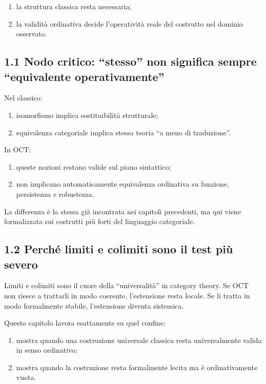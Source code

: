 \begin{enumerate}
\def\labelenumi{\arabic{enumi}.}
\tightlist
\item
  la struttura classica resta necessaria;
\item
  la validità ordinativa decide l'operatività reale del costrutto nel dominio osservato.
\end{enumerate}

\subsection{1.1 Nodo critico: ``stesso'' non significa sempre ``equivalente operativamente''}

Nel classico:

\begin{enumerate}
\def\labelenumi{\arabic{enumi}.}
\tightlist
\item
  isomorfismo implica sostituibilità strutturale;
\item
  equivalenza categoriale implica stessa teoria ``a meno di traduzione''.
\end{enumerate}

In OCT:

\begin{enumerate}
\def\labelenumi{\arabic{enumi}.}
\tightlist
\item
  queste nozioni restano valide sul piano sintattico;
\item
  non implicano automaticamente equivalenza ordinativa su funzione, persistenza e robustezza.
\end{enumerate}

La differenza è la stessa già incontrata nei capitoli precedenti, ma qui viene formalizzata sui costrutti più forti del linguaggio categoriale.

\subsection{1.2 Perché limiti e colimiti sono il test più severo}

Limiti e colimiti sono il cuore della ``universalità'' in category theory. Se OCT non riesce a trattarli in modo coerente, l'estensione resta locale. Se li tratta in modo formalmente stabile, l'estensione diventa sistemica.

Questo capitolo lavora esattamente su quel confine:

\begin{enumerate}
\def\labelenumi{\arabic{enumi}.}
\tightlist
\item
  mostra quando una costruzione universale classica resta universalmente valida in senso ordinativo;
\item
  mostra quando la costruzione resta formalmente lecita ma è ordinativamente vuota.
\end{enumerate}

